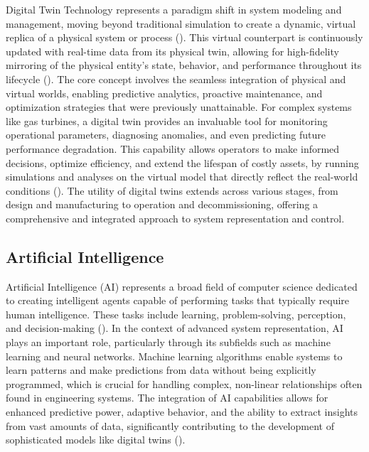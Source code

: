 \documentclass[
  12pt,
  oneside,
  a4paper,
  english,
  brazil]{abntex2}
\begin{document}
Digital Twin Technology represents a paradigm shift in system modeling
and management, moving beyond traditional simulation to create a
dynamic, virtual replica of a physical system or process
(). This virtual
counterpart is continuously updated with real-time data from its
physical twin, allowing for high-fidelity mirroring of the physical
entity's state, behavior, and performance throughout its lifecycle
(). The core concept
involves the seamless integration of physical and virtual worlds,
enabling predictive analytics, proactive maintenance, and optimization
strategies that were previously unattainable. For complex systems like
gas turbines, a digital twin provides an invaluable tool for monitoring
operational parameters, diagnosing anomalies, and even predicting future
performance degradation. This capability allows operators to make
informed decisions, optimize efficiency, and extend the lifespan of
costly assets, by running simulations and analyses on the virtual model
that directly reflect the real-world conditions
(). The utility
of digital twins extends across various stages, from design and
manufacturing to operation and decommissioning, offering a comprehensive
and integrated approach to system representation and control.

\subsection{Artificial Intelligence}\label{artificial-intelligence}

Artificial Intelligence (AI) represents a broad field of computer
science dedicated to creating intelligent agents capable of performing
tasks that typically require human intelligence. These tasks include
learning, problem-solving, perception, and decision-making
(). In the
context of advanced system representation, AI plays an important role,
particularly through its subfields such as machine learning and neural
networks. Machine learning algorithms enable systems to learn patterns
and make predictions from data without being explicitly programmed,
which is crucial for handling complex, non-linear relationships often
found in engineering systems. The integration of AI capabilities allows
for enhanced predictive power, adaptive behavior, and the ability to
extract insights from vast amounts of data, significantly contributing
to the development of sophisticated models like digital twins
().
\end{document}
